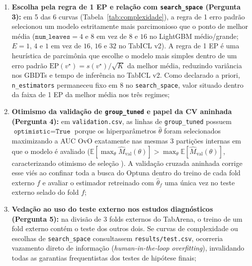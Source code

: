 \documentclass[11pt,a4paper]{article}
\begin{document}
\begin{enumerate}[leftmargin=2em]
    \item \textbf{Escolha pela regra de 1 EP e relação com \texttt{search\_space} (Pergunta 3):} em 5 das 6 curvas (Tabela~\ref{tab:complexidade}), a regra de 1 erro padrão \cite{breiman1984classification} selecionou um modelo estritamente mais parcimonioso que o ponto de melhor média ($\texttt{num\_leaves} = 4$ e $8$ em vez de $8$ e $16$ no LightGBM médio/grande; $E = 1$, $4$ e $1$ em vez de $16$, $16$ e $32$ no TabICL v2). A regra de 1 EP é uma heurística de parcimônia que escolhe o modelo mais simples dentro de um erro padrão $\text{EP}(v^\star) = s(v^\star)/\sqrt{K}$ da melhor média, reduzindo variância nos GBDTs e tempo de inferência no TabICL v2. Como declarado a priori, \texttt{n\_estimators} permaneceu fixo em $8$ no \texttt{search\_space}, valor situado dentro da faixa de 1 EP da melhor média nos três regimes;
    \item \textbf{Otimismo da validação de \texttt{group\_tuned} e papel da CV aninhada (Pergunta 4):} em \texttt{validation.csv}, as linhas de \texttt{group\_tuned} possuem $\texttt{optimistic} = \texttt{True}$ porque os hiperparâmetros $\hat{\theta}$ foram selecionados maximizando a AUC OvO exatamente nas mesmas 3 partições internas em que o modelo é avaliado ($\mathbb{E}[\max_\theta \hat{M}_{\mathrm{val}}(\theta)] > \max_\theta \mathbb{E}[\hat{M}_{\mathrm{val}}(\theta)]$, caracterizando otimismo de seleção \cite{cawley2010overfitting,varma2006bias}). A validação cruzada aninhada corrige esse viés ao confinar toda a busca do Optuna dentro do treino de cada fold externo $f$ e avaliar o estimador retreinado com $\hat{\theta}_f$ uma única vez no teste externo selado do fold $f$;
    \item \textbf{Vedação ao uso do teste externo nos estudos diagnósticos (Pergunta 5):} na divisão de 3 folds externos do TabArena, o treino de um fold externo contém o teste dos outros dois. Se curvas de complexidade ou escolhas de \texttt{search\_space} consultassem \texttt{results/test.csv}, ocorreria vazamento direto de informação (\emph{human-in-the-loop overfitting}), invalidando todas as garantias frequentistas dos testes de hipótese finais;

\end{enumerate}
\end{document}
